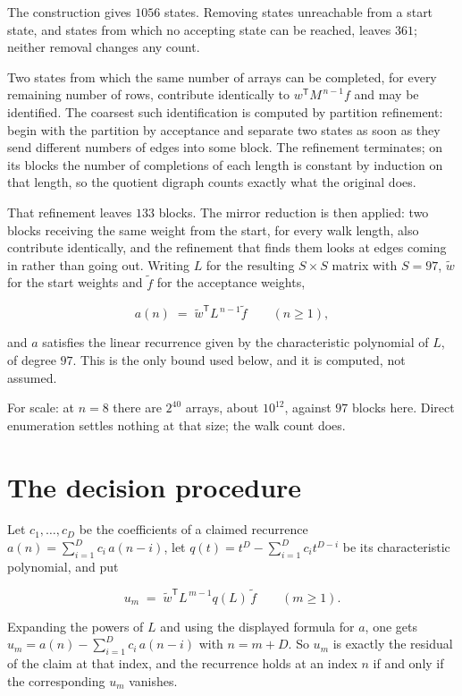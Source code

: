 \documentclass[11pt]{article}
\theoremstyle{definition}
\begin{document}
The construction gives $1056$ states. Removing states unreachable from a start state, and states from which no accepting state can be reached, leaves $361$; neither removal changes any count.

Two states from which the same number of arrays can be completed, for every remaining number of rows, contribute identically to $w^{\mathsf T}M^{\,n-1}f$ and may be identified. The coarsest such identification is computed by partition refinement: begin with the partition by acceptance and separate two states as soon as they send different numbers of edges into some block. The refinement terminates; on its blocks the number of completions of each length is constant by induction on that length, so the quotient digraph counts exactly what the original does.

That refinement leaves $133$ blocks. The mirror reduction is then applied: two blocks receiving the same weight from the start, for every walk length, also contribute identically, and the refinement that finds them looks at edges coming in rather than going out. Writing $L$ for the resulting $S \times S$ matrix with $S = 97$, $\tilde w$ for the start weights and $\tilde f$ for the acceptance weights,

\[a(n) \;=\; \tilde w^{\mathsf T} L^{\,n-1} \tilde f \qquad (n \ge 1),\]

and $a$ satisfies the linear recurrence given by the characteristic polynomial of $L$, of degree $97$. This is the only bound used below, and it is computed, not assumed.

For scale: at $n = 8$ there are $2^{40}$ arrays, about $10^{12}$, against $97$ blocks here. Direct enumeration settles nothing at that size; the walk count does.

\section{The decision procedure}

Let $c_1,\dots,c_D$ be the coefficients of a claimed recurrence $a(n) = \sum_{i=1}^{D} c_i\,a(n-i)$, let $q(t) = t^{D} - \sum_{i=1}^{D} c_i t^{D-i}$ be its characteristic polynomial, and put

\[u_m \;=\; \tilde w^{\mathsf T} L^{\,m-1} q(L)\,\tilde f \qquad (m \ge 1).\]

Expanding the powers of $L$ and using the displayed formula for $a$, one gets $u_m = a(n) - \sum_{i=1}^{D} c_i\,a(n-i)$ with $n = m + D$. So $u_m$ is exactly the residual of the claim at that index, and the recurrence holds at an index $n$ if and only if the corresponding $u_m$ vanishes.
\end{document}
